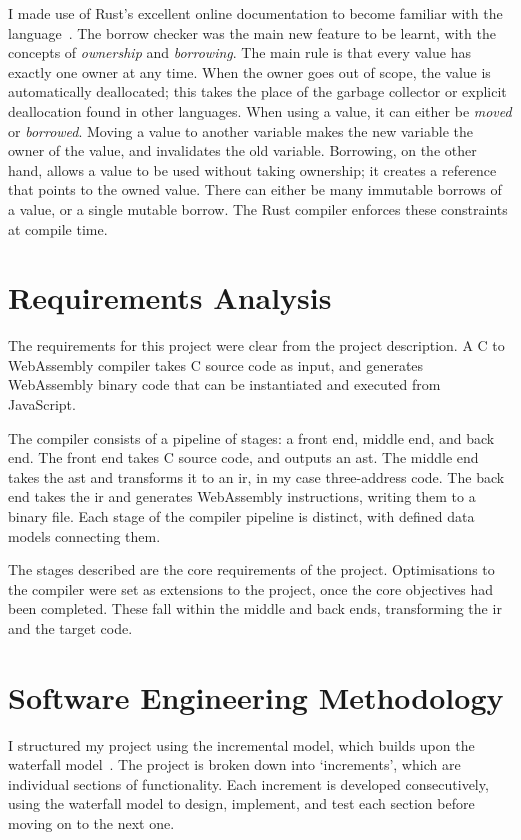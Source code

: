 \documentclass[00-main.tex]{subfiles}
\begin{document}
I made use of Rust's excellent online documentation to become familiar with the language~.
The borrow checker was the main new feature to be learnt, with the concepts of \emph{ownership} and \emph{borrowing}.
The main rule is that every value has exactly one owner at any time.
When the owner goes out of scope, the value is automatically deallocated; this takes the place of the garbage collector or explicit deallocation found in other languages.
When using a value, it can either be \emph{moved} or \emph{borrowed}.
Moving a value to another variable makes the new variable the owner of the value, and invalidates the old variable.
Borrowing, on the other hand, allows a value to be used without taking ownership; it creates a reference that points to the owned value.
There can either be many immutable borrows of a value, or a single mutable borrow.
The Rust compiler enforces these constraints at compile time.

\section{Requirements Analysis}

The requirements for this project were clear from the project description.
A C to WebAssembly compiler takes C source code as input, and generates WebAssembly binary code that can be instantiated and executed from JavaScript.

The compiler consists of a pipeline of stages: a front end, middle end, and back end.
The front end takes C source code, and outputs an \gls{ast}.
The middle end takes the \gls{ast} and transforms it to an \gls{ir}, in my case three-address code.
The back end takes the \gls{ir} and generates WebAssembly instructions, writing them to a binary file.
Each stage of the compiler pipeline is distinct, with defined data models connecting them.

The stages described are the core requirements of the project.
Optimisations to the compiler were set as extensions to the project, once the core objectives had been completed.
These fall within the middle and back ends, transforming the \gls{ir} and the target code.



\section{Software Engineering Methodology}

I structured my project using the incremental model, which builds upon the waterfall model~.
The project is broken down into `increments', which are individual sections of functionality.
Each increment is developed consecutively, using the waterfall model to design, implement, and test each section before moving on to the next one.
\end{document}

